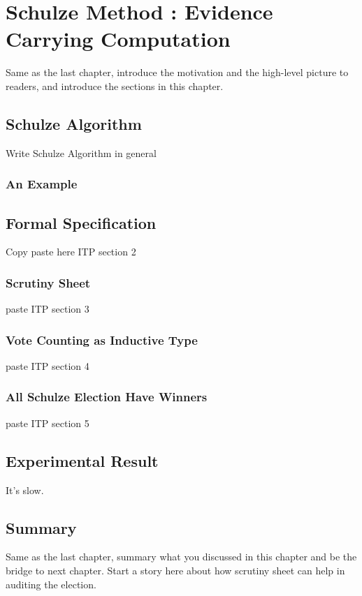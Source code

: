 \chapter{Schulze Method : Evidence Carrying Computation}
\label{cha:schulze_method}
Same as the last chapter, introduce the motivation and the high-level picture to
readers, and introduce the sections in this chapter.


\section{Schulze Algorithm}
	Write Schulze Algorithm in general 
	\subsection{An Example}
	
	
\section{Formal Specification}
	Copy paste here ITP section 2
	\subsection{Scrutiny Sheet}
    		paste ITP section 3
	\subsection{Vote Counting as Inductive Type}
    paste ITP section 4
	\subsection{All Schulze Election Have Winners}
    paste ITP section 5	
\section{Experimental Result}
  It's slow.
\section{Summary}
Same as the last chapter, summary what you discussed in this chapter and
be the bridge to next chapter. Start a story here about how scrutiny sheet 
can help in auditing the election.